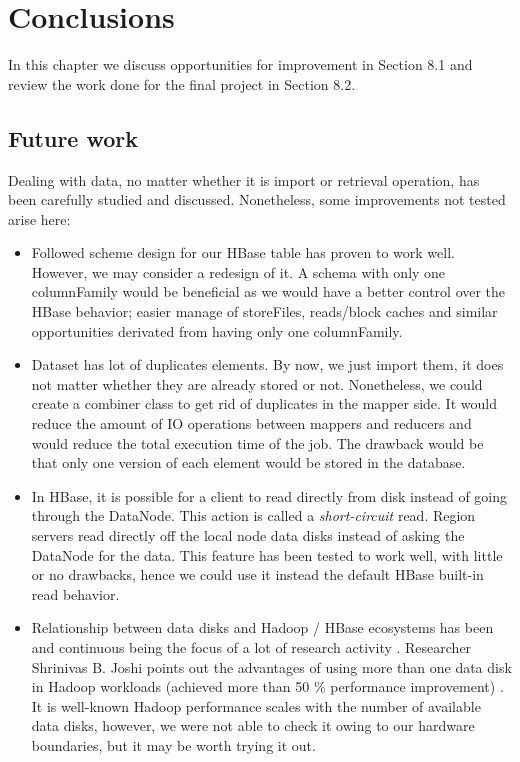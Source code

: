 \chapter{Conclusions}
\label{chapter:conclusions}

In this chapter we discuss opportunities for improvement in Section 8.1 and review the work done for the final project in Section 8.2.

\section{Future work}

Dealing with data, no matter whether it is import or retrieval operation, has been carefully studied and discussed. Nonetheless, some improvements not tested arise here:
\begin{itemize}
\item Followed scheme design for our HBase table has proven to work well. However, we may consider a redesign of it. A schema with only one columnFamily would be beneficial as we would have a better control over the HBase behavior; easier manage of storeFiles, reads/block caches and similar opportunities derivated from having only one columnFamily. 
\item Dataset has lot of duplicates elements. By now, we just import them, it does not matter whether they are already stored or not. Nonetheless, we could create a combiner class to get rid of duplicates in the mapper side. It would reduce the amount of IO operations between mappers and reducers and would reduce the total execution time of the job. The drawback would be that only one version of each element would be stored in the database.
\item In HBase, it is possible for a client to read directly from disk instead of going through the DataNode. This action is called a \textit{short-circuit} read. Region servers read directly off the local node data disks instead of asking the DataNode for the data. This feature has been tested to work well, with little or no drawbacks, hence we could use it instead the default HBase built-in read behavior.
\item Relationship between data disks and Hadoop / HBase ecosystems has been and continuous being the focus of a lot of research activity \cite{kangcase} \cite{fan2009diskreduce} \cite{awasthi2012hybrid}. Researcher Shrinivas B. Joshi points out the advantages of using more than one data disk in Hadoop workloads (achieved more than 50 \% performance improvement) \cite{joshi2012apache}. It is well-known Hadoop performance scales with the number of available data disks, however, we were not able to check it owing to our hardware boundaries, but it may be worth trying it out. 
\end{itemize}


